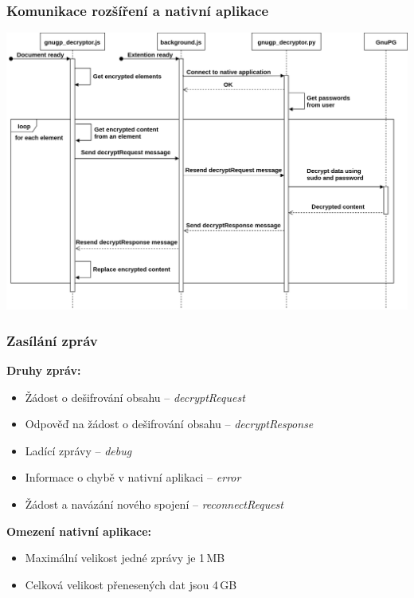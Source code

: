 \documentclass[10pt,xcolor=pdflatex]{beamer}
\begin{document}
\begin{frame}
    \frametitle{Komunikace rozšíření a nativní aplikace}
    \includegraphics[width=\textwidth]{../obrazky-figures/sequence-gnupg_decryptor.png}
\end{frame}

\begin{frame}
    \frametitle{Zasílání zpráv}
    \textbf{Druhy zpráv:}
    \begin{itemize}
        \item Žádost o dešifrování obsahu -- \textit{decryptRequest}
        \item Odpověď na žádost o dešifrování obsahu -- \textit{decryptResponse}
        \item Ladící zprávy -- \textit{debug}
        \item Informace o chybě v nativní aplikaci -- \textit{error}
        \item Žádost a navázání nového spojení -- \textit{reconnectRequest}
    \end{itemize}
    \medskip
    \textbf{Omezení nativní aplikace:}
    \begin{itemize}
        \item Maximální velikost jedné zprávy je 1\,MB
        \item Celková velikost přenesených dat jsou 4\,GB
    \end{itemize}
\end{frame}
\end{document}
